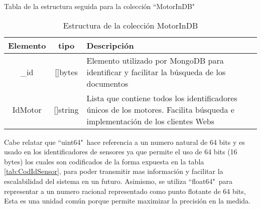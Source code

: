 \vspace{1cm}


    \begin{table}[ht]
        \begin{center}
            Tabla de la estructura seguida para la colección ``MotorInDB"\ \\
            \vspace{0.3cm}
            \begin{tabular}{|c|c|p{11cm}|}
                \hline
                Elemento & tipo     & Descripción \\\hline\hline
                \_id      & []bytes  & Elemento utilizado por MongoDB para
                identificar y facilitar la búsqueda de los documentos\\\hline
                IdMotor  & []string & Lista que contiene todos los identificadores
                únicos de los motores. Facilita búsqueda e implementación de los
                clientes Webs\\\hline
            \end{tabular}
        \end{center}
        \caption[Estructura de MotorInDB]{Estructura de la colección MotorInDB}
        \label{tab:MotorInDBbson}
    \end{table}

    Cabe relatar que ``uint64"\  hace referencia a un numero natural de 64 bits
    y es usado en los identificadores de sensores ya que permite el uso de 64
    bits (16 bytes) los cuales son codificados de
    la forma expuesta en la tabla \ref{tab:CodIdSensor}, para
    poder transmitir mas información y facilitar la escalabilidad del sistema en
    un futuro.
    Asimismo, se utiliza
    ``float64"\ para representar  a un numero racional representado como punto
    flotante de 64 bits, Esta es una unidad común porque permite maximizar la
    precisión en la medida.

